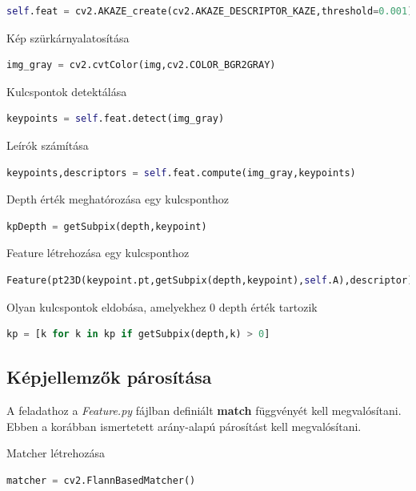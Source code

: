 \documentclass[12pt,a4paper,oneside]{report}             %
\begin{document}
\begin{lstlisting}[language=Python]
self.feat = cv2.AKAZE_create(cv2.AKAZE_DESCRIPTOR_KAZE,threshold=0.001)
\end{lstlisting}

Kép szürkárnyalatosítása

\begin{lstlisting}[language=Python]
img_gray = cv2.cvtColor(img,cv2.COLOR_BGR2GRAY)
\end{lstlisting}

Kulcspontok detektálása

\begin{lstlisting}[language=Python]
keypoints = self.feat.detect(img_gray)
\end{lstlisting}

Leírók számítása

\begin{lstlisting}[language=Python]
keypoints,descriptors = self.feat.compute(img_gray,keypoints)
\end{lstlisting}

Depth érték meghatórozása egy kulcsponthoz

\begin{lstlisting}[language=Python]
kpDepth = getSubpix(depth,keypoint)
\end{lstlisting}

Feature létrehozása egy kulcsponthoz

\begin{lstlisting}[language=Python]
Feature(pt23D(keypoint.pt,getSubpix(depth,keypoint),self.A),descriptor)
\end{lstlisting}

Olyan kulcspontok eldobása, amelyekhez $0$ depth érték tartozik

\begin{lstlisting}[language=Python]
kp = [k for k in kp if getSubpix(depth,k) > 0]
\end{lstlisting}

\subsection{Képjellemzők párosítása}

A feladathoz a \emph{Feature.py} fájlban definiált \textbf{match} függvényét kell megvalósítani. Ebben a korábban ismertetett arány-alapú párosítást kell megvalósítani.

Matcher létrehozása

\begin{lstlisting}[language=Python]
matcher = cv2.FlannBasedMatcher()
\end{lstlisting}
\end{document}
